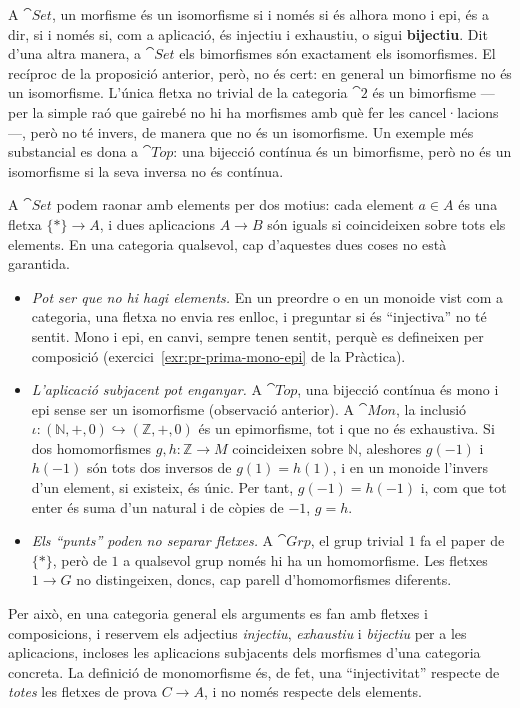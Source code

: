 \begin{observacio}
A $\cat{Set}$, un morfisme és un isomorfisme si i només si és alhora mono i epi, és a dir, si i només si, com a aplicació, és injectiu i exhaustiu, o sigui \textbf{bijectiu}. Dit d'una altra manera, a $\cat{Set}$ els bimorfismes són exactament els isomorfismes. El recíproc de la proposició anterior, però, no és cert: en general un bimorfisme no és un isomorfisme. L'única fletxa no trivial de la categoria $\cat{2}$ és un bimorfisme ---per la simple raó que gairebé no hi ha morfismes amb què fer les cancel·lacions---, però no té invers, de manera que no és un isomorfisme. Un exemple més substancial es dona a $\cat{Top}$: una bijecció contínua és un bimorfisme, però no és un isomorfisme si la seva inversa no és contínua.
\end{observacio}

\begin{observacio}\label{obs:raonar-elements}
A $\cat{Set}$ podem raonar amb elements per dos motius: cada element $a\in A$ és una fletxa $\{\ast\}\to A$, i dues aplicacions $A\to B$ són iguals si coincideixen sobre tots els elements. En una categoria qualsevol, cap d'aquestes dues coses no està garantida.
\begin{itemize}
\item \emph{Pot ser que no hi hagi elements.} En un preordre o en un monoide vist com a categoria, una fletxa no envia res enlloc, i preguntar si és \enquote{injectiva} no té sentit. Mono i epi, en canvi, sempre tenen sentit, perquè es defineixen per composició (exercici~\ref{exr:pr-prima-mono-epi} de la Pràctica).
\item \emph{L'aplicació subjacent pot enganyar.} A $\cat{Top}$, una bijecció contínua és mono i epi sense ser un isomorfisme (observació anterior). A $\cat{Mon}$, la inclusió $\iota\colon(\mathbb N,+,0)\hookrightarrow(\mathbb Z,+,0)$ és un epimorfisme, tot i que no és exhaustiva. Si dos homomorfismes $g,h\colon\mathbb Z\to M$ coincideixen sobre $\mathbb N$, aleshores $g(-1)$ i $h(-1)$ són tots dos inversos de $g(1)=h(1)$, i en un monoide l'invers d'un element, si existeix, és únic. Per tant, $g(-1)=h(-1)$ i, com que tot enter és suma d'un natural i de còpies de $-1$, $g=h$.
\item \emph{Els \enquote{punts} poden no separar fletxes.} A $\cat{Grp}$, el grup trivial $1$ fa el paper de $\{\ast\}$, però de $1$ a qualsevol grup només hi ha un homomorfisme. Les fletxes $1\to G$ no distingeixen, doncs, cap parell d'homomorfismes diferents.
\end{itemize}
Per això, en una categoria general els arguments es fan amb fletxes i composicions, i reservem els adjectius \emph{injectiu}, \emph{exhaustiu} i \emph{bijectiu} per a les aplicacions, incloses les aplicacions subjacents dels morfismes d'una categoria concreta. La definició de monomorfisme és, de fet, una \enquote{injectivitat} respecte de \emph{totes} les fletxes de prova $C\to A$, i no només respecte dels elements.
\end{observacio}

